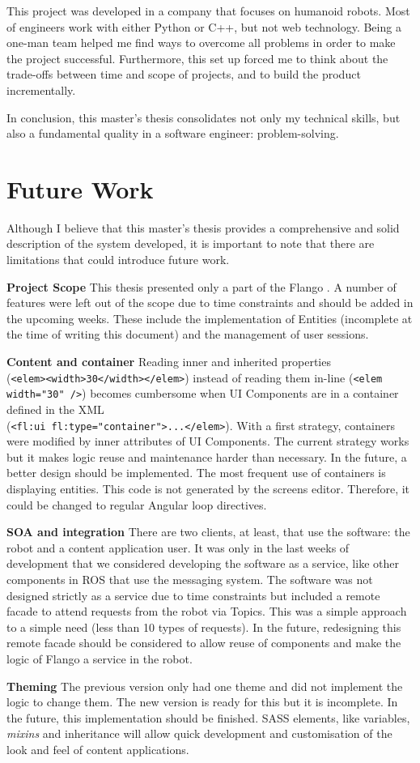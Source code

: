 This project was developed in a company that focuses on humanoid robots.
Most of engineers work with either Python or C++, but not web technology.
Being a one-man team helped me find ways to overcome all problems in order to make the project successful.
Furthermore, this set up forced me to think about the trade-offs between time and scope of projects, and to build the product incrementally.

In conclusion, this master's thesis consolidates not only my technical skills, but also a fundamental quality in a software engineer: problem-solving.


\section{Future Work}
Although I believe that this master's thesis provides a comprehensive and solid description of the system developed, it is important to note that there are limitations that could introduce future work.

\textbf{Project Scope} This thesis presented only a part of the Flango \cm . 
A number of features were left out of the scope due to time constraints and should be added in the upcoming weeks.
These include the implementation of Entities (incomplete at the time of writing this document) and the management of user sessions.

\textbf{Content and container} Reading inner and inherited properties \\(\lstinline$<elem><width>30</width></elem>$) instead of reading them in-line (\lstinline$<elem width="30" />$) becomes cumbersome when UI Components are in a container defined in the \ac{XML} \\ (\lstinline$<fl:ui fl:type="container">...</elem>$).
With a first strategy, containers were modified by inner attributes of UI Components.
The current strategy works but it makes logic reuse and maintenance harder than necessary.
In the future, a better design should be implemented.
The most frequent use of containers is displaying entities.
This code is not generated by the screens editor. 
Therefore, it could be changed to regular Angular loop directives.

\textbf{SOA and integration} There are two clients, at least, that use the software: the robot and a content application user.
It was only in the last weeks of development that we considered developing the software as a service, like other components in \ac{ROS} that use the messaging system.
The software was not designed strictly as a service due to time constraints but included a remote facade to attend requests from the robot via Topics.
This was a simple approach to a simple need (less than 10 types of requests).
In the future, redesigning this remote facade should be considered to allow reuse of components and make the logic of Flango \cm a service in the robot.

\textbf{Theming} The previous version only had one theme and did not implement the logic to change them.
The new version is ready for this but it is incomplete.
In the future, this implementation should be finished.
\ac{SASS} elements, like variables, \textit{mixins} and inheritance will allow quick development and customisation of the look and feel of content applications.
